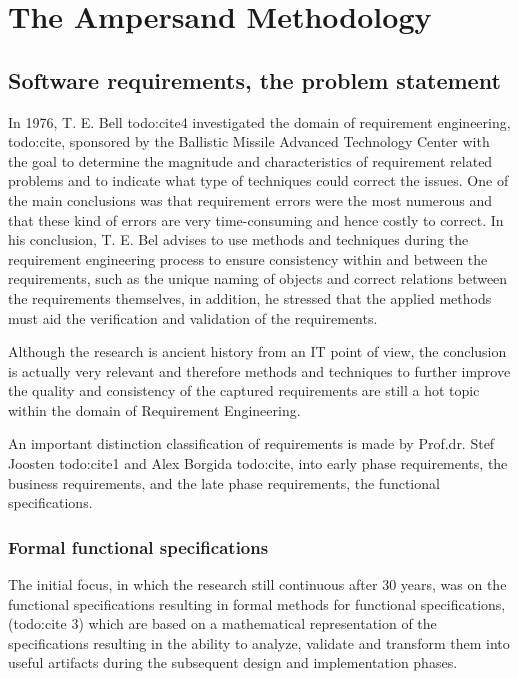 
\section{The Ampersand Methodology}
\label{sec:AmpersandApproach}

\subsection{Software requirements, the problem statement}

In 1976,  T. E. Bell todo:cite4 investigated the domain of requirement engineering, todo:cite, sponsored by the Ballistic Missile Advanced Technology Center with the goal to determine the magnitude and characteristics of requirement related problems and to indicate what type of techniques could correct the issues. One of the main conclusions was that requirement errors were the most numerous and that these kind of errors are very time-consuming and hence costly to correct.
In his conclusion,  T. E. Bel advises to use methods and techniques during the requirement engineering process to ensure consistency within and  between the requirements, such as the unique naming of objects and correct relations between the requirements themselves, in addition, he stressed that the applied methods must aid the verification and validation of the requirements.
 
Although the research is ancient history from an IT point of view, the conclusion is actually very relevant and therefore methods and techniques to further improve the quality and consistency of the captured requirements are still a hot topic within the domain of Requirement Engineering.

An important distinction classification of requirements is made by  Prof.dr. Stef Joosten todo:cite1 and Alex Borgida todo:cite, into early phase requirements, the business requirements, and the late phase requirements, the functional specifications. 

\subsubsection{Formal functional specifications}
The initial focus, in which the research still continuous after 30 years, was on the functional specifications resulting in formal methods for functional specifications, (todo:cite 3) which are based on a mathematical representation of the specifications resulting in the ability to analyze, validate and transform them into useful artifacts during the subsequent design and implementation phases. 

